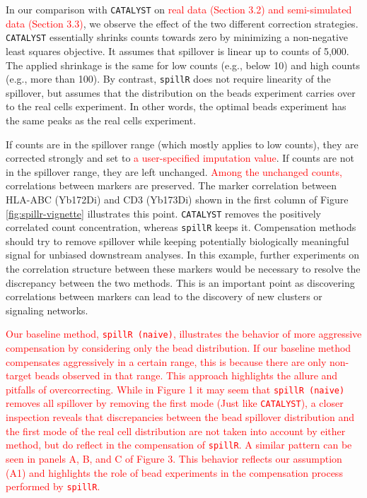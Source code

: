 \documentclass[
]{article}
\begin{document}
In our comparison with \texttt{CATALYST} on \textcolor{red}{real data (Section 3.2) and semi-simulated data (Section 3.3)}, we observe the effect of the two different correction strategies. \texttt{CATALYST} essentially shrinks counts towards zero by minimizing a non-negative least squares objective. It assumes that spillover is linear up to counts of 5,000. The applied shrinkage is the same for low counts (e.g., below 10) and high counts (e.g., more than 100). By contrast, \texttt{spillR} does not require linearity of the spillover, but assumes that the distribution on the beads experiment carries over to the real cells experiment. In other words, the optimal beads experiment has the same peaks as the real cells experiment.

If counts are in the spillover range (which mostly applies to low counts), they are corrected strongly and set to \textcolor{red}{a user-specified imputation value}. If counts are not in the spillover range, they are left unchanged.
\textcolor{red}{Among the unchanged counts,} correlations between markers are preserved. The marker correlation between HLA-ABC (Yb172Di) and CD3 (Yb173Di) shown in the first column of Figure \ref{fig:spillr-vignette} illustrates this point. \texttt{CATALYST} removes the positively correlated count concentration, whereas \texttt{spillR} keeps it. Compensation methods should try to remove spillover while keeping potentially biologically meaningful signal for unbiased downstream analyses. In this example, further experiments on the correlation structure between these markers would be necessary to resolve the discrepancy between the two methods. This is an important point as discovering correlations between markers can lead to the discovery of new clusters or signaling networks.

\textcolor{red}{
Our baseline method, \texttt{spillR (naive)}, illustrates the behavior of more aggressive compensation by considering only the bead distribution. If our baseline method compensates aggressively in a certain range, this is because there are only non-target beads observed in that range. This approach highlights the allure and pitfalls of overcorrecting. While in Figure 1 it may seem that \texttt{spillR (naive)} removes all spillover by removing the first mode (Just like \texttt{CATALYST}), a closer inspection reveals that discrepancies between the bead spillover distribution and the first mode of the real cell distribution are not taken into account by either method, but do reflect in the compensation of \texttt{spillR}. A similar pattern can be seen in panels A, B, and C of Figure 3. This behavior reflects our assumption (A1) and highlights the role of bead experiments in the compensation process performed by \texttt{spillR}.
}
\end{document}
